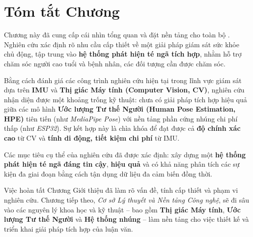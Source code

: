 
\section{Tóm tắt Chương}
\label{sec:chapter1_conclusion}

Chương này đã cung cấp cái nhìn tổng quan và đặt nền tảng cho toàn bộ \TENLUANVAN. Nghiên cứu xác định rõ nhu cầu cấp thiết về một giải pháp giám sát sức khỏe chủ động, tập trung vào \textbf{hệ thống phát hiện té ngã tích hợp}, nhằm hỗ trợ chăm sóc người cao tuổi và bệnh nhân, các đối tượng cần được chăm sóc.

Bằng cách đánh giá các công trình nghiên cứu hiện tại trong lĩnh vực giám sát dựa trên \textbf{IMU} và \textbf{Thị giác Máy tính (Computer Vision, CV)}, nghiên cứu nhận diện được một khoảng trống kỹ thuật: chưa có giải pháp tích hợp hiệu quả giữa các mô hình \textbf{Ước lượng Tư thế Người (Human Pose Estimation, HPE)} tiên tiến (như \textit{MediaPipe Pose}) với nền tảng phần cứng nhúng chi phí thấp (như \textit{ESP32}). Sự kết hợp này là chìa khóa để đạt được cả \textbf{độ chính xác cao} từ CV và \textbf{tính di động, tiết kiệm chi phí} từ IMU.

Các mục tiêu cụ thể của nghiên cứu đã được xác định: xây dựng một \textbf{hệ thống phát hiện té ngã đáng tin cậy}, \textbf{hiệu quả} và có khả năng phân tích các sự kiện đa giai đoạn bằng cách tận dụng dữ liệu đa cảm biến đồng thời.

Việc hoàn tất Chương Giới thiệu đã làm rõ vấn đề, tính cấp thiết và phạm vi nghiên cứu. Chương tiếp theo, \textit{Cơ sở Lý thuyết và Nền tảng Công nghệ}, sẽ đi sâu vào các nguyên lý khoa học và kỹ thuật – bao gồm \textbf{Thị giác Máy tính}, \textbf{Ước lượng Tư thế Người} và \textbf{Hệ thống nhúng} – làm nền tảng cho việc thiết kế và triển khai giải pháp tích hợp của luận văn.
